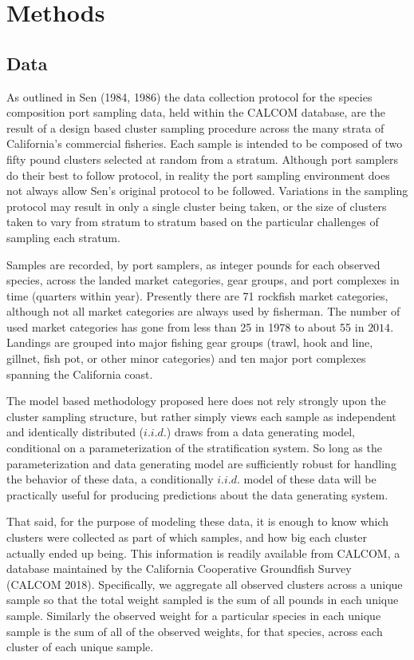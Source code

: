 \documentclass[12pt]{article}
\begin{document}
\section{Methods}\label{methods}

\subsection{Data}\label{data}

As outlined in Sen (1984, 1986) the data collection protocol for the
species composition port sampling data, held within the CALCOM database,
are the result of a design based cluster sampling procedure across the
many strata of California's commercial fisheries. Each sample is
intended to be composed of two fifty pound clusters selected at random
from a stratum. Although port samplers do their best to follow protocol,
in reality the port sampling environment does not always allow Sen's
original protocol to be followed. Variations in the sampling protocol
may result in only a single cluster being taken, or the size of clusters
taken to vary from stratum to stratum based on the particular challenges
of sampling each stratum.

Samples are recorded, by port samplers, as integer pounds for each
observed species, across the landed market categories, gear groups, and
port complexes in time (quarters within year). Presently there are 71
rockfish market categories, although not all market categories are
always used by fisherman. The number of used market categories has gone
from less than 25 in 1978 to about 55 in \(2014\). Landings are grouped
into major fishing gear groups (trawl, hook and line, gillnet, fish pot,
or other minor categories) and ten major port complexes spanning the
California coast.

The model based methodology proposed here does not rely strongly upon
the cluster sampling structure, but rather simply views each sample as
independent and identically distributed (\(i.i.d.\)) draws from a data
generating model, conditional on a parameterization of the
stratification system. So long as the parameterization and data
generating model are sufficiently robust for handling the behavior of
these data, a conditionally \(i.i.d.\) model of these data will be
practically useful for producing predictions about the data generating
system.

That said, for the purpose of modeling these data, it is enough to know
which clusters were collected as part of which samples, and how big each
cluster actually ended up being. This information is readily available
from CALCOM, a database maintained by the California Cooperative
Groundfish Survey (CALCOM 2018). Specifically, we aggregate all observed
clusters across a unique sample so that the total weight sampled is the
sum of all pounds in each unique sample. Similarly the observed weight
for a particular species in each unique sample is the sum of all of the
observed weights, for that species, across each cluster of each unique
sample.
\end{document}
